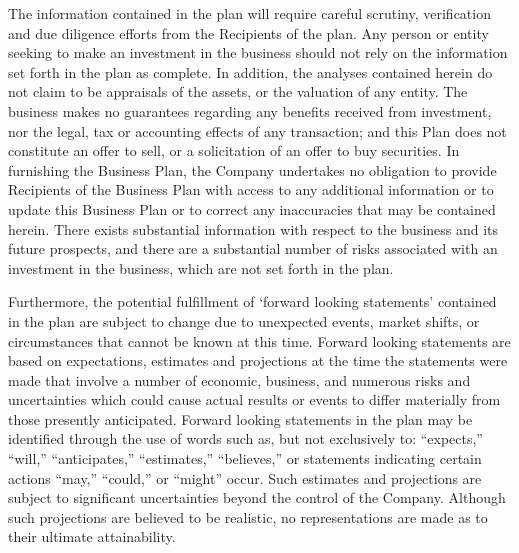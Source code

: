 \documentclass[10pt,openany]{book}
\begin{document}
      The information contained in the plan will require careful
      scrutiny, verification and due diligence efforts from the
      Recipients of the plan. Any person or entity seeking to make an
      investment in the business should not rely on the information set
      forth in the plan as complete. In addition, the analyses contained
      herein do not claim to be appraisals of the assets, or the
      valuation of any entity. The business makes no guarantees
      regarding any benefits received from investment, nor the legal,
      tax or accounting effects of any transaction; and this Plan does
      not constitute an offer to sell, or a solicitation of an offer to
      buy securities. In furnishing the Business Plan, the Company
      undertakes no obligation to provide Recipients of the Business
      Plan with access to any additional information or to update this
      Business Plan or to correct any inaccuracies that may be contained
      herein. There exists substantial information with respect to the
      business and its future prospects, and there are a substantial
      number of risks associated with an investment in the business,
      which are not set forth in the plan.

      Furthermore, the potential fulfillment of `forward looking
      statements' contained in the plan are subject to change due to
      unexpected events, market shifts, or circumstances that cannot be
      known at this time. Forward looking statements are based on
      expectations, estimates and projections at the time the statements
      were made that involve a number of economic, business, and
      numerous risks and uncertainties which could cause actual results
      or events to differ materially from those presently anticipated.
      Forward looking statements in the plan may be identified through
      the use of words such as, but not exclusively to: ``expects,''
      ``will,'' ``anticipates,'' ``estimates,'' ``believes,'' or
      statements indicating certain actions ``may,'' ``could,'' or
      ``might'' occur. Such estimates and projections are subject to
      significant uncertainties beyond the control of the Company.
      Although such projections are believed to be realistic, no
      representations are made as to their ultimate attainability.
    \newpage
  
              {
            \makeatletter
      \renewcommand*\l@section{\@dottedtocline{1}{1.5em}{3.0em}}
      \makeatother
      \setcounter{tocdepth}{2}
      \tableofcontents
    }
      
\end{document}

